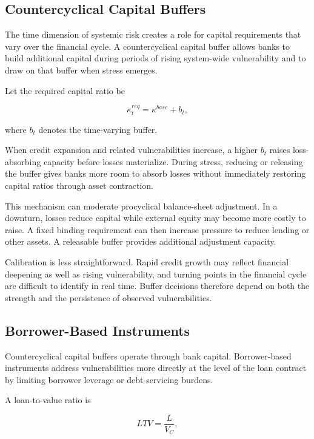 \subsection{Countercyclical Capital Buffers}

The time dimension of systemic risk creates a role for capital requirements that vary over the financial cycle. A countercyclical capital buffer allows banks to build additional capital during periods of rising system-wide vulnerability and to draw on that buffer when stress emerges.

Let the required capital ratio be

\begin{equation}
\kappa_t^{req}
=
\kappa^{base}+b_t,
\label{eq:ch23-ccyb}
\end{equation}

where \(b_t\) denotes the time-varying buffer.

When credit expansion and related vulnerabilities increase, a higher \(b_t\) raises loss-absorbing capacity before losses materialize. During stress, reducing or releasing the buffer gives banks more room to absorb losses without immediately restoring capital ratios through asset contraction.

This mechanism can moderate procyclical balance-sheet adjustment. In a downturn, losses reduce capital while external equity may become more costly to raise. A fixed binding requirement can then increase pressure to reduce lending or other assets. A releasable buffer provides additional adjustment capacity.

Calibration is less straightforward. Rapid credit growth may reflect financial deepening as well as rising vulnerability, and turning points in the financial cycle are difficult to identify in real time. Buffer decisions therefore depend on both the strength and the persistence of observed vulnerabilities.

\subsection{Borrower-Based Instruments}

Countercyclical capital buffers operate through bank capital. Borrower-based instruments address vulnerabilities more directly at the level of the loan contract by limiting borrower leverage or debt-servicing burdens.

A loan-to-value ratio is

\begin{equation}
LTV
=\frac{L}{V_C},
\label{eq:ch23-ltv}
\end{equation}

